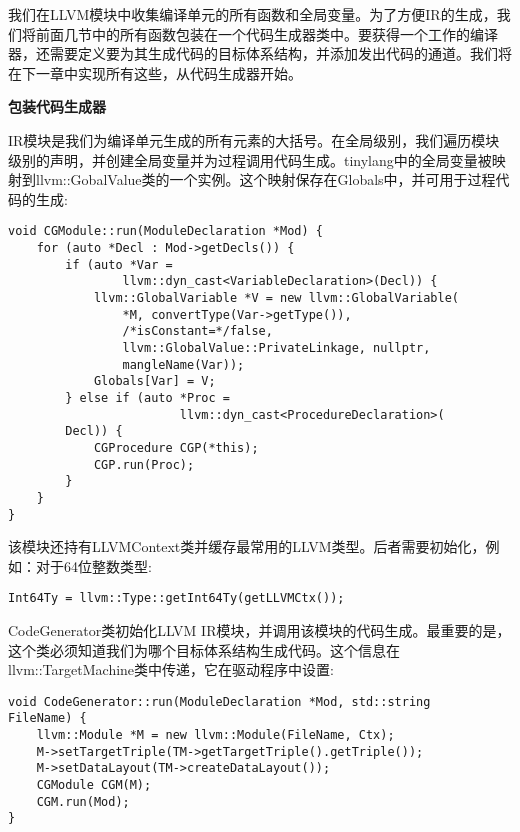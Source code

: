 

我们在LLVM模块中收集编译单元的所有函数和全局变量。为了方便IR的生成，我们将前面几节中的所有函数包装在一个代码生成器类中。要获得一个工作的编译器，还需要定义要为其生成代码的目标体系结构，并添加发出代码的通道。我们将在下一章中实现所有这些，从代码生成器开始。\par

\hspace*{\fill} \par %
\textbf{包装代码生成器}

IR模块是我们为编译单元生成的所有元素的大括号。在全局级别，我们遍历模块级别的声明，并创建全局变量并为过程调用代码生成。tinylang中的全局变量被映射到llvm::GobalValue类的一个实例。这个映射保存在Globals中，并可用于过程代码的生成:\par

\begin{lstlisting}[caption={}]
void CGModule::run(ModuleDeclaration *Mod) {
	for (auto *Decl : Mod->getDecls()) {
		if (auto *Var =
				llvm::dyn_cast<VariableDeclaration>(Decl)) {
			llvm::GlobalVariable *V = new llvm::GlobalVariable(
				*M, convertType(Var->getType()),
				/*isConstant=*/false,
				llvm::GlobalValue::PrivateLinkage, nullptr,
				mangleName(Var));
			Globals[Var] = V;
		} else if (auto *Proc =
						llvm::dyn_cast<ProcedureDeclaration>(
		Decl)) {
			CGProcedure CGP(*this);
			CGP.run(Proc);
		}
	}
}
\end{lstlisting}

该模块还持有LLVMContext类并缓存最常用的LLVM类型。后者需要初始化，例如：对于64位整数类型:\par

\begin{lstlisting}[caption={}]
Int64Ty = llvm::Type::getInt64Ty(getLLVMCtx());
\end{lstlisting}

CodeGenerator类初始化LLVM IR模块，并调用该模块的代码生成。最重要的是，这个类必须知道我们为哪个目标体系结构生成代码。这个信息在llvm::TargetMachine类中传递，它在驱动程序中设置:\par

\begin{lstlisting}[caption={}]
void CodeGenerator::run(ModuleDeclaration *Mod, std::string
FileName) {
	llvm::Module *M = new llvm::Module(FileName, Ctx);
	M->setTargetTriple(TM->getTargetTriple().getTriple());
	M->setDataLayout(TM->createDataLayout());
	CGModule CGM(M);
	CGM.run(Mod);
}
\end{lstlisting}

